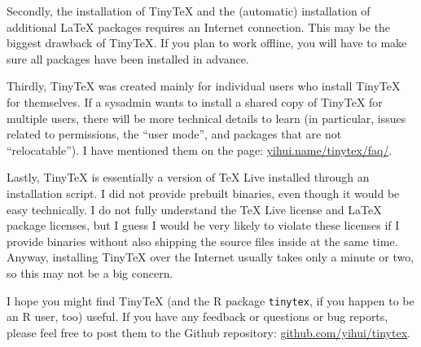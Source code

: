 \documentclass{ltugboat}
\def\tinytex{\texttt{tinytex}}
\begin{document}
Secondly, the installation of TinyTeX and the (automatic) installation
of additional \LaTeX{} packages requires an Internet connection. This may
be the biggest drawback of TinyTeX. If you plan to work offline, you
will have to make sure all packages have been installed in advance.

Thirdly, TinyTeX was created mainly for individual users who install
TinyTeX for themselves. If a sysadmin wants to install a shared copy of
TinyTeX for multiple users, there will be more technical details to
learn (in particular, issues related to permissions, the ``user mode'',
and packages that are not ``relocatable''). I have mentioned them on the
 page: \url{yihui.name/tinytex/faq/}.

Lastly, TinyTeX is essentially a version of \TeX{} Live installed through
an installation script. I did not provide prebuilt binaries, even though
it would be easy technically. I do not fully understand the \TeX{} Live
license and \LaTeX{} package licenses, but I guess I would be very likely
to violate these licenses if I provide binaries without also shipping
the source files inside at the same time. Anyway, installing TinyTeX
over the Internet usually takes only a minute or two, so this may not be
a big concern.

I hope you might find TinyTeX (and the R package \tinytex{}, if
you happen to be an R user, too) useful. If you have any feedback or
questions or bug reports, please feel free to post them to the Github
repository: \url{github.com/yihui/tinytex}.




\makesignature
\end{document}
